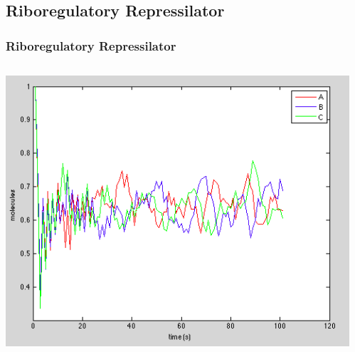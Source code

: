 \documentclass{beamer}
\begin{document}
\subsection{Riboregulatory Repressilator}
\begin{frame}
\frametitle{Riboregulatory Repressilator}

\begin{columns}[T]
  \begin{column}{0.5\textwidth}      
    \centering
       \includegraphics[scale=0.4]{repress_graph.png}
    \end{column}    
    \begin{column}{0.4\textwidth}
      \centering





\end{column}
\end{columns}
\end{frame}
\end{document}
